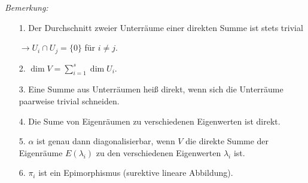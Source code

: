 \textit{Bemerkung:}
    \begin{itemize}
        \item [1.]Der Durchschnitt zweier Unterräume einer direkten Summe ist stets trivial \par $\rightarrow U_i\cap U_j=\lbrace0\rbrace$ für $i\neq j$.
        \item [2.]$\displaystyle{\dim V=\sum_{i=1}^s\dim U_i}$.
        \item [3.]Eine Summe aus Unterräumen heiß direkt, wenn sich die Unterräume paarweise trivial schneiden.
        \item [4.]Die Sume von Eigenräumen zu verschiedenen Eigenwerten ist direkt.
        \item [5.]$\alpha$ ist genau dann diagonalisierbar, wenn $V$ die direkte Summe der Eigenräume $E(\lambda_i)$ zu den verschiedenen Eigenwerten 
            $\lambda_i$ ist.
        \item [6.]$\pi_i$ ist ein Epimorphismus (surektive lineare Abbildung).
    \end{itemize}

